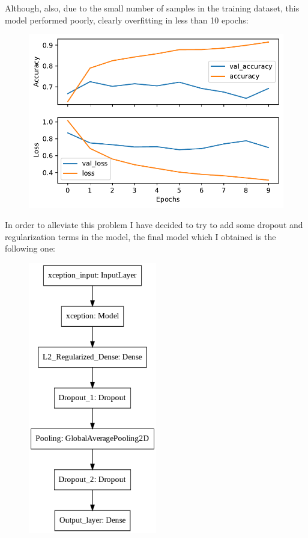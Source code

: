 \documentclass[a4paper]{article}
\begin{document}
Although, also, due to the small number of samples in the training dataset, this model performed poorly, clearly overfitting in less than 10 epochs:
\begin{figure} [h!]
\centering
\includegraphics[width=\textwidth]{first_train.pdf}
\label{fig: first_train}
\end{figure}

\newpage
In order to alleviate this problem I have decided to try to add some dropout and regularization terms in the model, the final model which I obtained is the following one:

\begin{figure} [h!]
\centering
\includegraphics[width=0.5\textwidth]{final_model.png}
\label{fig: final_model}
\end{figure}
\end{document}
